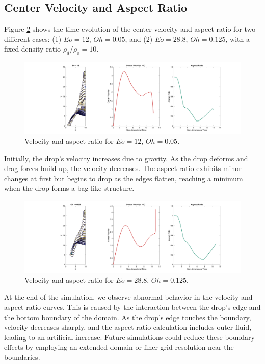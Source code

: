 \documentclass[12pt]{article}
\begin{document}
\subsection{Center Velocity and Aspect Ratio}
Figure \ref{fig:velocity_aspect} shows the time evolution of the center velocity and aspect ratio for two different cases: (1) $Eo = 12$, $Oh = 0.05$, and (2) $Eo = 28.8$, $Oh = 0.125$, with a fixed density ratio $\rho_d / \rho_o = 10$.

\begin{figure}[H]
    \centering
    \includegraphics[width=\textwidth]{figures/All_Eo=12__t=0.28.png}
    \caption{Velocity and aspect ratio for $Eo = 12$, $Oh = 0.05$.}
    \label{fig:velocity_aspect}
\end{figure}

Initially, the drop's velocity increases due to gravity. As the drop deforms and drag forces build up, the velocity decreases. The aspect ratio exhibits minor changes at first but begins to drop as the edges flatten, reaching a minimum when the drop forms a bag-like structure.

\begin{figure}[H]
    \centering
    \includegraphics[width=\textwidth]{Latex/figures/All_Oh=1.25_t=0.44.png}
    \caption{Velocity and aspect ratio for $Eo = 28.8$, $Oh = 0.125$.}
    \label{fig:velocity_aspect}
\end{figure}

At the end of the simulation, we observe abnormal behavior in the velocity and aspect ratio curves. This is caused by the interaction between the drop's edge and the bottom boundary of the domain. As the drop's edge touches the boundary, velocity decreases sharply, and the aspect ratio calculation includes outer fluid, leading to an artificial increase. Future simulations could reduce these boundary effects by employing an extended domain or finer grid resolution near the boundaries.
\end{document}
